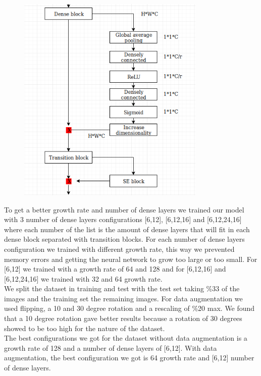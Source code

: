\documentclass[runningheads,a4paper]{llncs}
\begin{document}
\begin{figure}[H]
    \centering
    \includegraphics[width=0.8\textwidth]{background/sedense.png}
    \caption{}
    \label{figure:background:sedense}
\end{figure}

To get a better growth rate and number of dense layers we trained our model with 3 number of dense layers configurations [6,12], [6,12,16] and [6,12,24,16] where each number of the list is the amount of dense layers that will fit in each dense block separated with transition blocks. For each number of dense layers configuration we trained with different growth rate, this way we prevented memory errors and getting the neural network to grow too large or too small. For [6,12] we trained with a growth rate of 64 and 128 and for [6,12,16] and [6,12,24,16] we trained with 32 and 64 growth rate. \\

We split the dataset in training and test with the test set taking \%33 of the images and the training set the remaining images. For data augmentation we used flipping, a 10 and 30 degree rotation and a rescaling of \%20 max. We found that a 10 degree rotation gave better results because a rotation of 30 degrees showed to be too high for the nature of the dataset. \\

The best configurations we got for the dataset without data augmentation is a growth rate of 128 and a number of dense layers of [6,12]. With data augmentation, the best configuration we got is 64 growth rate and [6,12] number of dense layers.
\end{document}
